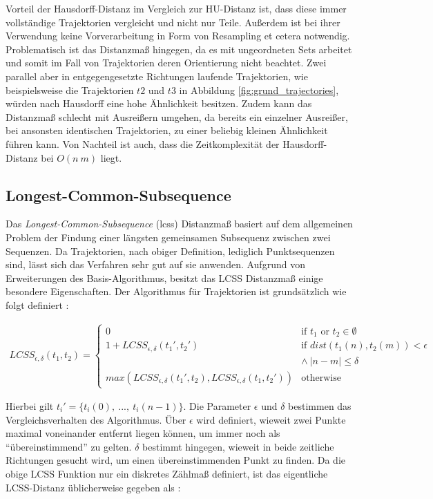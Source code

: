 Vorteil der Hausdorff-Distanz im Vergleich zur HU-Distanz ist, dass diese immer vollständige Trajektorien vergleicht
und nicht nur Teile. Außerdem ist bei ihrer Verwendung keine Vorverarbeitung in Form von Resampling et cetera notwendig.
Problematisch ist das Distanzmaß hingegen, da es mit ungeordneten Sets arbeitet und somit im Fall von Trajektorien deren
Orientierung nicht beachtet. Zwei parallel aber in entgegengesetzte Richtungen laufende Trajektorien, wie beispielsweise
die Trajektorien $t2$ und $t3$ in Abbildung \ref{fig:grund_trajectories}, würden nach Hausdorff eine hohe Ähnlichkeit besitzen.
Zudem kann das Distanzmaß schlecht mit Ausreißern umgehen, da bereits ein einzelner Ausreißer, bei ansonsten identischen
Trajektorien, zu einer beliebig kleinen Ähnlichkeit führen kann.
Von Nachteil ist auch, dass die Zeitkomplexität der Hausdorff-Distanz bei $O(n\ m)$ liegt.

\subsection{Longest-Common-Subsequence}
\label{sec:lcss_distance}

Das \textit{Longest-Common-Subsequence} (\acrshort*{lcss}) Distanzmaß basiert auf dem allgemeinen Problem der Findung
einer längsten gemeinsamen Subsequenz zwischen zwei Sequenzen. Da Trajektorien, nach obiger Definition, lediglich Punktsequenzen sind,
lässt sich das Verfahren sehr gut auf sie anwenden. Aufgrund von Erweiterungen des Basis-Algorithmus, besitzt
das LCSS Distanzmaß einige besondere Eigenschaften. Der Algorithmus für Trajektorien ist grundsätzlich
wie folgt definiert \cite[]{Vlachos2002}:

\begin{ceqn}
\begin{align}
\label{eq_lcss}
    LCSS_{\epsilon, \delta}(t_1, t_2) =
    \begin{cases}
        0 & \text{if } t_1 \text{ or } t_2 \in \emptyset \\
        1 + LCSS_{\epsilon, \delta}(t_1', t_2') & \text{if } dist(t_1(n), t_2(m)) < \epsilon \\
        & \land\ |n - m| \leq \delta \\
        max(LCSS_{\epsilon, \delta}(t_1', t_2), LCSS_{\epsilon, \delta}(t_1, t_2')) & \text{otherwise}
    \end{cases}
\end{align}
\end{ceqn}

Hierbei gilt $t_i' = \{ t_i(0),\ ...,\ t_i(n-1)\}$.
Die Parameter $\epsilon$ und $\delta$ bestimmen das
Vergleichsverhalten des Algorithmus. Über $\epsilon$ wird definiert, wieweit zwei Punkte maximal voneinander entfernt liegen
können, um immer noch als ``übereinstimmend'' zu gelten. $\delta$ bestimmt hingegen, wieweit in beide zeitliche Richtungen
gesucht wird, um einen übereinstimmenden Punkt zu finden.
Da die obige LCSS Funktion nur ein diskretes Zählmaß definiert, ist das eigentliche LCSS-Distanz üblicherweise
gegeben als \cite[]{Vlachos2002}:

